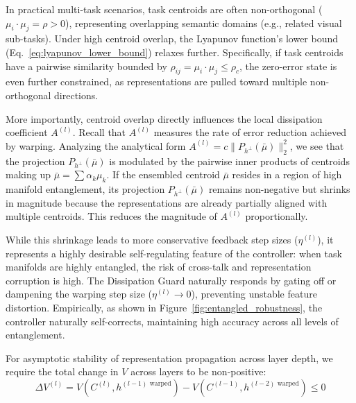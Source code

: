 \begin{remark}
In practical multi-task scenarios, task centroids are often non-orthogonal ($\mu_i \cdot \mu_j = \rho > 0$), representing overlapping semantic domains (e.g., related visual sub-tasks). Under high centroid overlap, the Lyapunov function's lower bound (Eq.~\ref{eq:lyapunov_lower_bound}) relaxes further. Specifically, if task centroids have a pairwise similarity bounded by $\rho_{ij} = \mu_i \cdot \mu_j \le \rho_c$, the zero-error state is even further constrained, as representations are pulled toward multiple non-orthogonal directions.

More importantly, centroid overlap directly influences the local dissipation coefficient $A^{(l)}$. Recall that $A^{(l)}$ measures the rate of error reduction achieved by warping. Analyzing the analytical form $A^{(l)} = c \|P_{h^\perp}(\bar{\mu})\|_2^2$, we see that the projection $P_{h^\perp}(\bar{\mu})$ is modulated by the pairwise inner products of centroids making up $\bar{\mu} = \sum \alpha_k \mu_k$. If the ensembled centroid $\bar{\mu}$ resides in a region of high manifold entanglement, its projection $P_{h^\perp}(\bar{\mu})$ remains non-negative but shrinks in magnitude because the representations are already partially aligned with multiple centroids. This reduces the magnitude of $A^{(l)}$ proportionally. 

While this shrinkage leads to more conservative feedback step sizes ($\eta^{(l)}$), it represents a highly desirable self-regulating feature of the controller: when task manifolds are highly entangled, the risk of cross-talk and representation corruption is high. The Dissipation Guard naturally responds by gating off or dampening the warping step size ($\eta^{(l)} \to 0$), preventing unstable feature distortion. Empirically, as shown in Figure~\ref{fig:entangled_robustness}, the controller naturally self-corrects, maintaining high accuracy across all levels of entanglement.
\end{remark}

For asymptotic stability of representation propagation across layer depth, we require the total change in $V$ across layers to be non-positive:
\begin{equation}
\Delta V^{(l)} = V(C^{(l)}, h^{(l-1) \text{ warped}}) - V(C^{(l-1)}, h^{(l-2) \text{ warped}}) \le 0
\label{eq:stability_cond_raw}
\end{equation}

